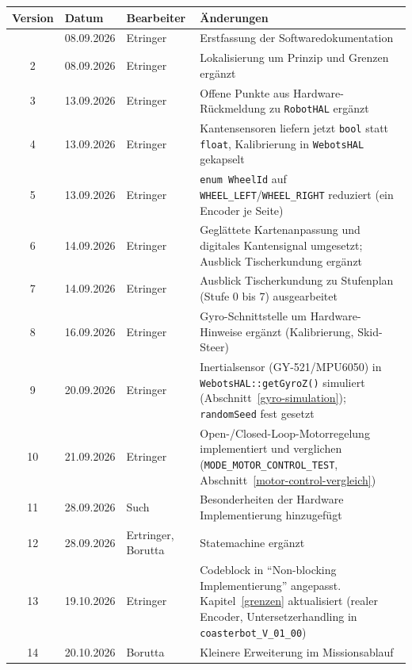 \documentclass[
  a4paper,
  12pt,
  DIV=12,        %
  parskip=half,  %
  headings=small %
]{scrartcl}
\theoremstyle{definition}
\theoremstyle{definition}
\begin{document}
\begin{longtable}{@{}clp{2.6cm}p{}@{}}
\toprule
\textbf{Version} & \textbf{Datum} & \textbf{Bearbeiter} & \textbf{Änderungen}\\
\midrule
\endhead
\bottomrule
\endfoot
1 & 08.09.2026 & Etringer & Erstfassung der Softwaredokumentation\\
2 & 08.09.2026 & Etringer & Lokalisierung um Prinzip und Grenzen ergänzt\\
3 & 13.09.2026 & Etringer & Offene Punkte aus Hardware-Rückmeldung zu \texttt{RobotHAL} ergänzt\\
4 & 13.09.2026 & Etringer & Kantensensoren liefern jetzt \texttt{bool} statt \texttt{float}, Kalibrierung in \texttt{WebotsHAL} gekapselt\\
5 & 13.09.2026 & Etringer & \texttt{enum WheelId} auf \texttt{WHEEL\_LEFT}/\texttt{WHEEL\_RIGHT} reduziert (ein Encoder je Seite)\\
6 & 14.09.2026 & Etringer & Geglättete Kartenanpassung und digitales Kantensignal umgesetzt; Ausblick Tischerkundung ergänzt\\
7 & 14.09.2026 & Etringer & Ausblick Tischerkundung zu Stufenplan (Stufe 0 bis 7) ausgearbeitet\\
8 & 16.09.2026 & Etringer & Gyro-Schnittstelle um Hardware-Hinweise ergänzt (Kalibrierung, Skid-Steer)\\
9 & 20.09.2026 & Etringer & Inertialsensor (GY-521/MPU6050) in \texttt{WebotsHAL::getGyroZ()} simuliert (Abschnitt~\ref{gyro-simulation}); \texttt{randomSeed} fest gesetzt\\
10 & 21.09.2026 & Etringer & Open-/Closed-Loop-Motorregelung implementiert und verglichen (\texttt{MODE\_MOTOR\_CONTROL\_TEST}, Abschnitt~\ref{motor-control-vergleich})\\
11 & 28.09.2026 & Such & Besonderheiten der Hardware Implementierung hinzugefügt\\
12 & 28.09.2026 & Ertringer, Borutta & Statemachine ergänzt \\
13 & 19.10.2026 & Etringer & Codeblock in \enquote{Non-blocking Implementierung} angepasst. Kapitel~\ref{grenzen} aktualisiert (realer Encoder, Untersetzerhandling in \texttt{coasterbot\_V\_01\_00})\\
14 & 20.10.2026 & Borutta & Kleinere Erweiterung im Missionsablauf\\
\end{longtable}
\end{document}
